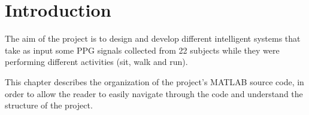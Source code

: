 \chapter{Introduction}\label{ch:intro}

The aim of the project is to design and develop different intelligent systems
that take as input some PPG signals collected from 22 subjects while they were
performing different activities (sit, walk and run).

This chapter describes the organization of the project's MATLAB source code, in
order to allow the reader to easily navigate through the code and understand
the structure of the project.




